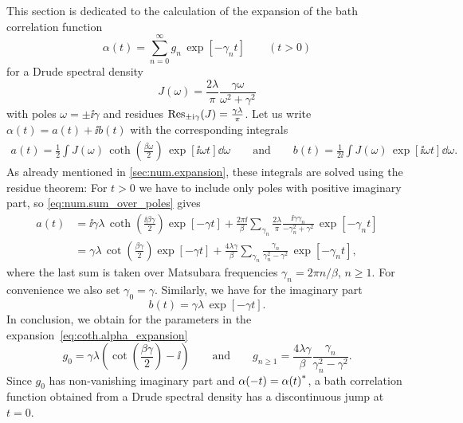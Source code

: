 This section is dedicated to the calculation of the expansion of the bath correlation function
\begin{equation}
  \alpha(t) = \sum_{n=0}^\infty g_n\,\exp[-\gamma_n t] \qquad (t > 0)
  \label{eq:coth.alpha_expansion}
\end{equation}
for a Drude spectral density
\begin{equation*}
  J(\omega) = \frac{2 \lambda}{\pi} \frac{\gamma\omega}{\omega^2 + \gamma^2}
\end{equation*}
with poles $\omega = \pm \ii\gamma$ and residues $\operatorname{Res}_{\pm\mathrm{i}\gamma} (J) = \frac{\gamma\lambda}{\pi}$.
Let us write $\alpha(t) = a(t) + \ii b(t)$ with the corresponding integrals
\begin{align*}
  a(t) = \frac{1}{2} \int J(\omega) \, \coth \left( \frac{\beta\omega}{2} \right) \, \exp[\ii\omega t] \dd\omega \qquad \mbox{and} \qquad
  b(t) = \frac{1}{2\ii} \int J(\omega) \, \exp[\ii\omega t] \dd\omega.
\end{align*}
As already mentioned in \autoref{sec:num.expansion}, these integrals are solved using the residue theorem:
For $t > 0$ we have to include only poles with positive imaginary part, so \autoref{eq:num.sum_over_poles} gives
\begin{align*}
  a(t) &= \ii \gamma\lambda\, \coth \left(\frac{\ii\beta\gamma}{2}\right) \exp[-\gamma t] + \frac{2\pi\ii}{\beta} \sum_{\gamma_n} \frac{2\lambda}{\pi} \frac{\ii\gamma\gamma_n}{-\gamma_n^2 + \gamma^2} \, \exp[-\gamma_n t] \\
  &= \gamma\lambda\, \cot \left(\frac{\beta\gamma}{2}\right) \exp[-\gamma t] + \frac{4\lambda\gamma}{\beta} \sum_{\gamma_n} \frac{\gamma_n}{\gamma_n^2 - \gamma^2} \, \exp[-\gamma_n t],
\end{align*}
where the last sum is taken over Matsubara frequencies $\gamma_n = 2\pi n / \beta$, $n \ge 1$.
For convenience we also set $\gamma_0 = \gamma$.
Similarly, we have for the imaginary part
\begin{equation*}
  b(t) = \gamma\lambda \, \exp[-\gamma t].
\end{equation*}
In conclusion, we obtain for the parameters in the expansion~\ref{eq:coth.alpha_expansion}
\begin{equation*}
  g_0 = \gamma\lambda \left(\cot \left( \frac{\beta \gamma}{2}\right) - \ii\right) \qquad \mbox{and} \qquad
  g_{n\ge1} = \frac{4\lambda\gamma}{\beta} \frac{\gamma_n}{\gamma_n^2 - \gamma^2}.
\end{equation*}
Since $g_0$ has non-vanishing imaginary part and $\alpha(-t) = {\alpha(t)}^*$, a bath correlation function obtained from a Drude spectral density has a discontinuous jump at $t = 0$.


